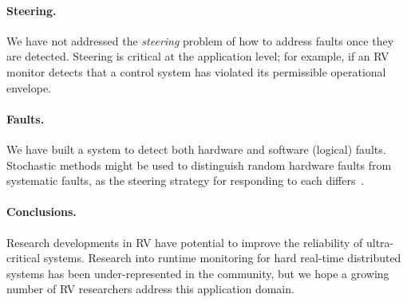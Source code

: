 \paragraph{Steering.}
We have not addressed the \emph{steering} problem of how to address faults once
they are detected.  Steering is critical at the application level; for example,
if an RV monitor detects that a control system has violated its permissible
operational envelope.

\paragraph{Faults.}
We have built a system to detect both hardware and software (logical) faults.
Stochastic methods might be used to distinguish random hardware faults from
systematic faults, as the steering strategy for responding to each
differs~\cite{SammapunLS05}.

\paragraph{Conclusions.}
Research developments in RV have potential to improve the reliability of
ultra-critical systems.  Research into runtime monitoring for hard real-time
distributed systems has been under-represented in the community, but we hope a
growing number of RV researchers address this application domain.

